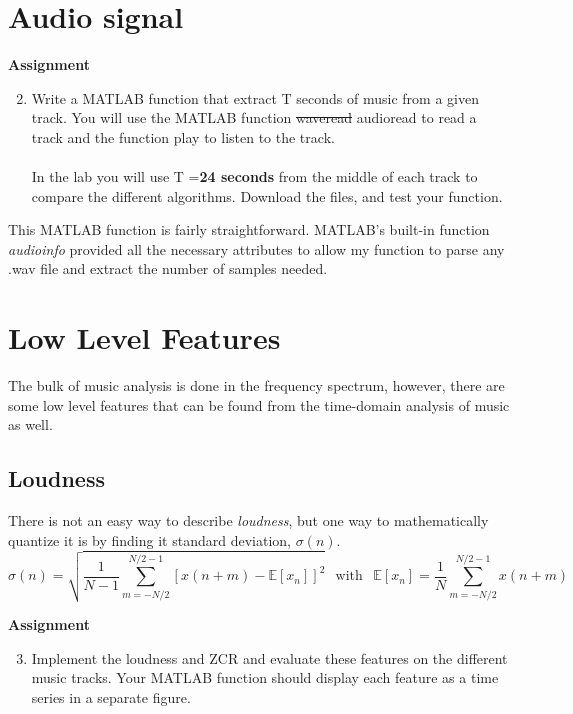\documentclass{article} %
\begin{document}
\section{Audio signal}

\begin{framed}
\textbf{Assignment}
\begin{enumerate}
\setcounter{enumi}{1}
\item Write a MATLAB function that extract T seconds of music from a given track. You
will use the MATLAB function \sout{waveread} audioread to read a track and the function play to
listen to the track.\\\\
In the lab you will use T =\textbf{24 seconds} from the middle of each track to compare the
different algorithms. Download the files, and test your function.
\end{enumerate}
\end{framed}

This MATLAB function is fairly straightforward. MATLAB's built-in function \emph{audioinfo} provided all the necessary attributes to allow my function to parse
any .wav file and extract the number of samples needed. 

\section{Low Level Features}
The bulk of music analysis is done in the frequency spectrum, however, 
there are some low level features that can be found from the time-domain
analysis of music as well. 
\subsection{Loudness}
There is not an easy way to describe \emph{loudness}, but 
one way to mathematically quantize it is by finding it
standard deviation, $\sigma(n)$. \\
\begin{equation}\label{eq:loud_std}
\sigma(n)=\sqrt{\frac{1}{N-1} \sum\limits_{m=-N/2}^{N/2-1} 
[ x(n+m)-\mathbb{E}[x_n]]^2 }\hspace{5pt} \text{ with }\hspace{5pt} 
\mathbb{E}[x_n]=\frac{1}{N}\sum\limits_{m=-N/2}^{N/2-1}x(n+m)
\end{equation}

\begin{framed}
\textbf{Assignment}
\begin{enumerate}
\setcounter{enumi}{2}
\item Implement the loudness and ZCR and evaluate these features on the different music
tracks. Your MATLAB function should display each feature as a time series in a separate
figure.
\end{enumerate}
\end{framed}
\end{document}
